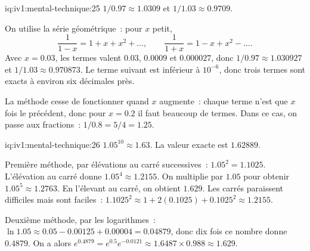 \begin{solution}{iq:iv1:mental-technique:25}
$1/0.97 \approx 1.0309$ et $1/1.03 \approx 0.9709$.

On utilise la série géométrique~: pour $x$ petit,
\[
\frac{1}{1 - x} = 1 + x + x^2 + \dots, \qquad \frac{1}{1 + x} = 1 - x + x^2 - \dots.
\]
Avec $x = 0.03$, les termes valent $0.03$, $0.0009$ et $0.000027$, donc $1/0.97 \approx 1.030927$ et $1/1.03 \approx 0.970873$. Le terme suivant est inférieur à $10^{-6}$, donc trois termes sont exacts à environ six décimales près.

La méthode cesse de fonctionner quand $x$ augmente~: chaque terme n'est que $x$ fois le précédent, donc pour $x = 0.2$ il faut beaucoup de termes. Dans ce cas, on passe aux fractions~: $1/0.8 = 5/4 = 1.25$.

\end{solution}

\begin{solution}{iq:iv1:mental-technique:26}
$1.05^{10} \approx 1.63$. La valeur exacte est $1.62889$.

Première méthode, par élévations au carré successives~: $1.05^2 = 1.1025$. L'élévation au carré donne $1.05^4 \approx 1.2155$. On multiplie par $1.05$ pour obtenir $1.05^5 \approx 1.2763$. En l'élevant au carré, on obtient $1.629$. Les carrés paraissent difficiles mais sont faciles~: $1.1025^2 \approx 1 + 2(0.1025) + 0.1025^2 \approx 1.2155$.

Deuxième méthode, par les logarithmes~: $\ln 1.05 \approx 0.05 - 0.00125 + 0.00004 = 0.04879$, donc dix fois ce nombre donne $0.4879$. On a alors $e^{0.4879} = e^{0.5} e^{-0.0121} \approx 1.6487 \times 0.988 \approx 1.629$.

\end{solution}

